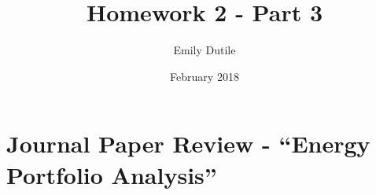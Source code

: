 \documentclass{neu_handout}
\title{Homework 2 - Part 3}
\author{Emily Dutile}
\date{February 2018}
\begin{document}
\section*{Journal Paper Review - “Energy Portfolio Analysis”}
\end{document}
